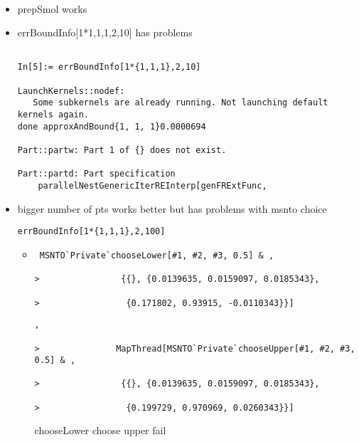\documentclass[hyperref]{labbook}
\begin{document}
\begin{description}[style=nextline] 
\item[finishPaper.mth] \ 
  \begin{itemize}
  \item prepSmol works
  \item errBoundInfo[1*{1,1,1},2,10]  has problems
\begin{verbatim}

In[5]:= errBoundInfo[1*{1,1,1},2,10]

LaunchKernels::nodef: 
   Some subkernels are already running. Not launching default kernels again.
done approxAndBound{1, 1, 1}0.0000694

Part::partw: Part 1 of {} does not exist.

Part::partd: Part specification 
    parallelNestGenericIterREInterp[genFRExtFunc, 
\end{verbatim}
  \item bigger number of pts works better but has problems with msnto choice
\begin{verbatim}
errBoundInfo[1*{1,1,1},2,100]
\end{verbatim}
    \begin{itemize}
    \item
\begin{verbatim}
 MSNTO`Private`chooseLower[#1, #2, #3, 0.5] & , 
 
>                {{}, {0.0139635, 0.0159097, 0.0185343}, 
 
>                 {0.171802, 0.93915, -0.0110343}}]
\end{verbatim}
\begin{verbatim}
, 
 
>               MapThread[MSNTO`Private`chooseUpper[#1, #2, #3, 0.5] & , 
 
>                {{}, {0.0139635, 0.0159097, 0.0185343}, 
 
>                 {0.199729, 0.970969, 0.0260343}}]
\end{verbatim}
      chooseLower choose upper fail
    \end{itemize}
  \end{itemize}
\end{description}
\end{document}
